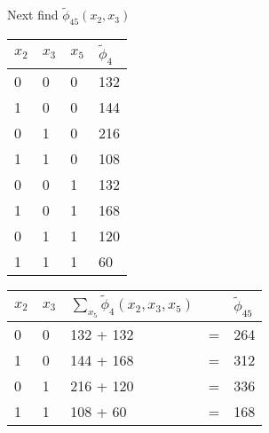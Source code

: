 \begin{exenumerate}
\begin{solution}
    Next find $\tilde{\phi}_{45}(x_2, x_3)$
    \begin{center}
      \begin{tabular}{llll}
        \toprule
        $x_2$ & $x_3$ & $x_5$ & $\tilde{\phi}_4$\\
        \midrule
        0 & 0 & 0 & 132 \\
        1 & 0 & 0 & 144 \\
        0 & 1 & 0 & 216 \\
        1 & 1 & 0 & 108 \\
        0 & 0 & 1 & 132 \\
        1 & 0 & 1 & 168 \\
        0 & 1 & 1 & 120 \\
        1 & 1 & 1 & 60 \\
        \bottomrule
      \end{tabular}
      \hspace{3ex}  \hspace{3ex}
      \begin{tabular}{lllll}
        \toprule
        $x_2$ & $x_3$ & $\sum_{x_5} \tilde{\phi}_4(x_2, x_3, x_5)$ &  & $\tilde{\phi}_{45}$\\
        \midrule
        0 & 0 & 132 + 132 & = & 264 \\
        1 & 0 & 144 + 168 & = & 312 \\
        0 & 1 & 216 + 120 & = & 336 \\
        1 & 1 & 108 + 60  & = & 168 \\
        \bottomrule
      \end{tabular}
    \end{center}


\end{solution}
\end{exenumerate}
